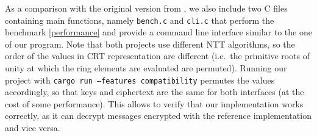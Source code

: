 \documentclass{report}
\newcommand{\code}[1]{\texttt{#1}}
\begin{document}
As a comparison with the original version from \cite{NistirFstRound}, we also include two C files containing main functions, namely \code{bench.c} and \code{cli.c} that perform the benchmark \ref{performance} and provide a command line interface similar to the one of our program. Note that both projects use different NTT algorithms, so the order of the values in CRT representation are different (i.e.\ the primitive roots of unity at which the ring elements are evaluated are permuted). Running our project with \code{cargo run --features compatibility} permutes the values accordingly, so that keys and ciphertext are the same for both interfaces (at the cost of some performance). This allows to verify that our implementation works correctly, as it can decrypt messages encrypted with the reference implementation and vice versa.

\printbibliography
\end{document}
